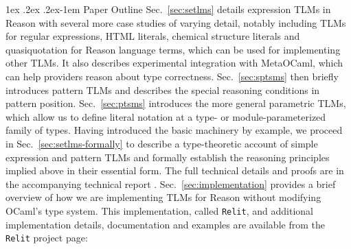 \documentclass[acmsmall,screen]{acmart}
\makeatletter
\renewcommand{\paragraph}{%
  \@startsection{paragraph}{4}%
  {\z@}{1ex \@plus .2ex \@minus .2ex}{-1em}%
  {\normalfont\normalsize\bfseries}%
}
\newcommand{\li}[1]{\lstinline[basicstyle=\ttfamily\fontsize{9pt}{1em}\selectfont]{#1}}
\makeatother
\begin{document}
\paragraph{Paper Outline} 
Sec.~\ref{sec:setlms} details expression TLMs in Reason with several more case studies of varying detail, notably including TLMs for regular expressions, HTML literals, chemical structure literals and quasiquotation for Reason language terms, which can be used for implementing other TLMs. It also describes experimental integration with MetaOCaml, which can help providers reason about type correctness.
Sec.~\ref{sec:sptsms} then briefly introduces {pattern TLMs} and describes the special reasoning conditions in pattern position. %
Sec.~\ref{sec:ptsms} introduces the more general {parametric TLMs}, which allow us to define literal notation at a type- or module-parameterized family of types.
 Having introduced the basic machinery by example, we proceed in 
Sec.~\ref{sec:setlms-formally} to describe a type-theoretic account of simple expression and pattern TLMs and formally establish the reasoning principles implied above in their essential form. The full technical details and proofs are in the accompanying technical report \cite{icfp18tr}.
Sec.~\ref{sec:implementation} provides a brief overview of how we are implementing TLMs for Reason without modifying OCaml's type system. %
This implementation, called \li{Relit}, and additional implementation details, documentation and examples are available from the \li{Relit} project page:
\end{document}
